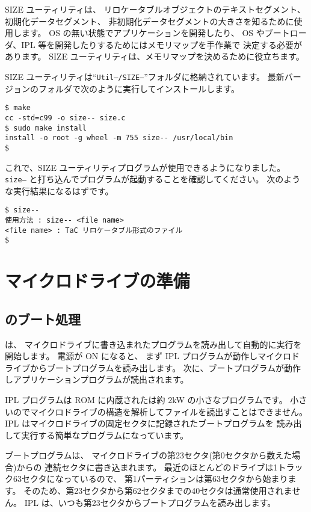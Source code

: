SIZE ユーティリティは、
リロケータブルオブジェクトのテキストセグメント、
初期化データセグメント、
非初期化データセグメントの大きさを知るために使用します。
OS の無い状態でアプリケーションを開発したり、
OS やブートローダ、IPL 等を開発したりするためにはメモリマップを手作業で
決定する必要があります。
SIZE ユーティリティは、メモリマップを決めるために役立ちます。

SIZE ユーティリティは``{\tt Util--/SIZE--}''フォルダに格納されています。
最新バージョンのフォルダで次のように実行してインストールします。

\begin{mylist}
\begin{verbatim}
$ make
cc -std=c99 -o size-- size.c
$ sudo make install
install -o root -g wheel -m 755 size-- /usr/local/bin
$ 
\end{verbatim}
\end{mylist}

これで、SIZE ユーティリティプログラムが使用できるようになりました。
{\tt size--} と打ち込んでプログラムが起動することを確認してください。
次のような実行結果になるはずです。

\begin{mylist}
\begin{verbatim}
$ size--
使用方法 : size-- <file name>
<file name> : TaC リロケータブル形式のファイル
$
\end{verbatim}
\end{mylist}

\section{マイクロドライブの準備}

\subsection{\tac のブート処理}

\tac は、
マイクロドライブに書き込まれたプログラムを読み出して自動的に実行を開始します。
電源が ON になると、
まず IPL プログラムが動作しマイクロドライブからブートプログラムを読み出します。
次に、ブートプログラムが動作しアプリケーションプログラムが読出されます。

IPL プログラムは ROM に内蔵されたは約 2kW の小さなプログラムです。
小さいのでマイクロドライブの構造を解析してファイルを読出すことはできません。
IPL はマイクロドライブの固定セクタに記録されたブートプログラムを
読み出して実行する簡単なプログラムになっています。

ブートプログラムは、
マイクロドライブの第23セクタ(第0セクタから数えた場合)からの
連続セクタに書き込まれます。
最近のほとんどのドライブは1トラック63セクタになっているので、
第1パーティションは第63セクタから始まります。
そのため、第23セクタから第62セクタまでの40セクタは通常使用されません。
IPL は、いつも第23セクタからブートプログラムを読み出します。

